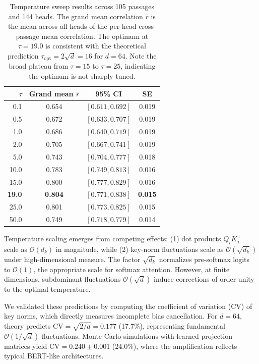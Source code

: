 \documentclass[twoside,11pt]{article}
\begin{document}
\begin{table}[h]
\centering
\renewcommand{\arraystretch}{1.15}
\begin{tabular}{rccc}
\hline
$\tau$ & Grand mean $\bar{r}$ & 95\% CI & SE \\
\hline
0.1  & 0.654 & $[0.611, 0.692]$ & 0.019 \\
0.5  & 0.672 & $[0.633, 0.707]$ & 0.019 \\
1.0  & 0.686 & $[0.640, 0.719]$ & 0.019 \\
2.0  & 0.705 & $[0.667, 0.741]$ & 0.019 \\
5.0  & 0.743 & $[0.704, 0.777]$ & 0.018 \\
10.0 & 0.783 & $[0.749, 0.813]$ & 0.016 \\
15.0 & 0.800 & $[0.777, 0.829]$ & 0.016 \\
\textbf{19.0} & \textbf{0.804} & $\mathbf{[0.771, 0.838]}$ & \textbf{0.015} \\
25.0 & 0.801 & $[0.773, 0.825]$ & 0.015 \\
50.0 & 0.749 & $[0.718, 0.779]$ & 0.014 \\
\hline
\end{tabular}
\caption{Temperature sweep results across 105 passages and 144 heads. The grand mean correlation $\bar{r}$ is the mean across all heads of the per-head cross-passage mean correlation. The optimum at $\tau = 19.0$ is consistent with the theoretical prediction $\tau_{\text{opt}} = 2\sqrt{d} = 16$ for $d = 64$. Note the broad plateau from $\tau = 15$ to $\tau = 25$, indicating the optimum is not sharply tuned.}
\label{tab:tau_sweep}
\end{table}

Temperature scaling emerges from competing effects: (1) dot products $Q_i K_j^\top$ scale as $\mathcal{O}(d_k)$ in magnitude, while (2) key-norm fluctuations scale as $\mathcal{O}(\sqrt{d_k})$ under high-dimensional measure. The factor $\sqrt{d_k}$ normalizes pre-softmax logits to $\mathcal{O}(1)$, the appropriate scale for softmax attention. However, at finite dimensions, subdominant fluctuations $\mathcal{O}(\sqrt{d})$ induce corrections of order unity to the optimal temperature.

We validated these predictions by computing the coefficient of variation (CV) of key norms, which directly measures incomplete bias cancellation. For $d = 64$, theory predicts $\text{CV} = \sqrt{2/d} = 0.177$ (17.7\%), representing fundamental $\mathcal{O}(1/\sqrt{d})$ fluctuations. Monte Carlo simulations with learned projection matrices yield $\text{CV} = 0.240 \pm 0.001$ (24.0\%), where the amplification reflects typical BERT-like architectures.
\end{document}
